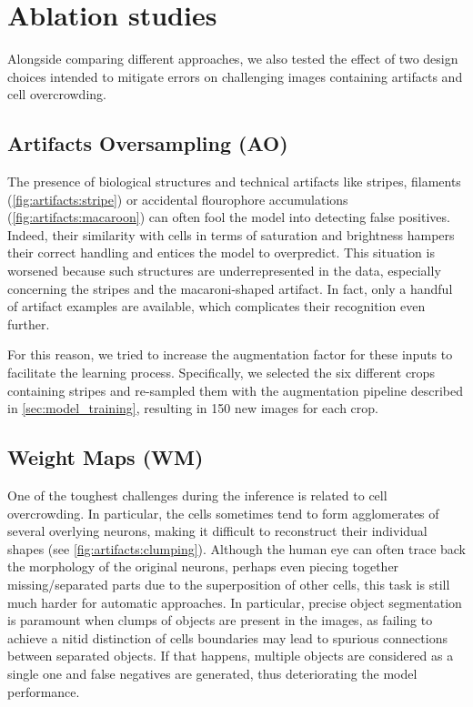 \section{Ablation studies}
\label{sec:ablation_studies}

Alongside comparing different approaches, we also tested the effect of two design choices intended to mitigate errors on challenging images containing artifacts and cell overcrowding.

\subsection{Artifacts Oversampling (AO)}

The presence of biological structures and technical artifacts like stripes, filaments (\cref{fig:artifacts:stripe}) or accidental flourophore accumulations (\cref{fig:artifacts:macaroon})  can often fool the model into detecting false positives.
Indeed, their similarity with cells in terms of saturation and brightness hampers their correct handling and entices the model to overpredict.
This situation is worsened because such structures are underrepresented in the data, especially concerning the stripes and the macaroni-shaped artifact.
In fact, only a handful of artifact examples are available, which complicates their recognition even further.

For this reason, we tried to increase the augmentation factor for these inputs to facilitate the learning process.
Specifically, we selected the six different crops containing stripes and re-sampled them with the augmentation pipeline described in \cref{sec:model_training}, resulting in 150 new images for each crop.

\subsection{Weight Maps (WM)} \label{sec:weights_map}

One of the toughest challenges during the inference is related to cell overcrowding.
In particular, the cells sometimes tend to form agglomerates of several overlying neurons, making it difficult to reconstruct their individual shapes (see \cref{fig:artifacts:clumping}).
Although the human eye can often trace back the morphology of the original neurons, perhaps even piecing together missing/separated parts due to the superposition of other cells, this task is still much harder for automatic approaches.
In particular, precise object segmentation is paramount when clumps of objects are present in the images, as failing to achieve a nitid distinction of cells boundaries may lead to spurious connections between separated objects. 
If that happens, multiple objects are considered as a single one and false negatives are generated, thus deteriorating the model performance.

